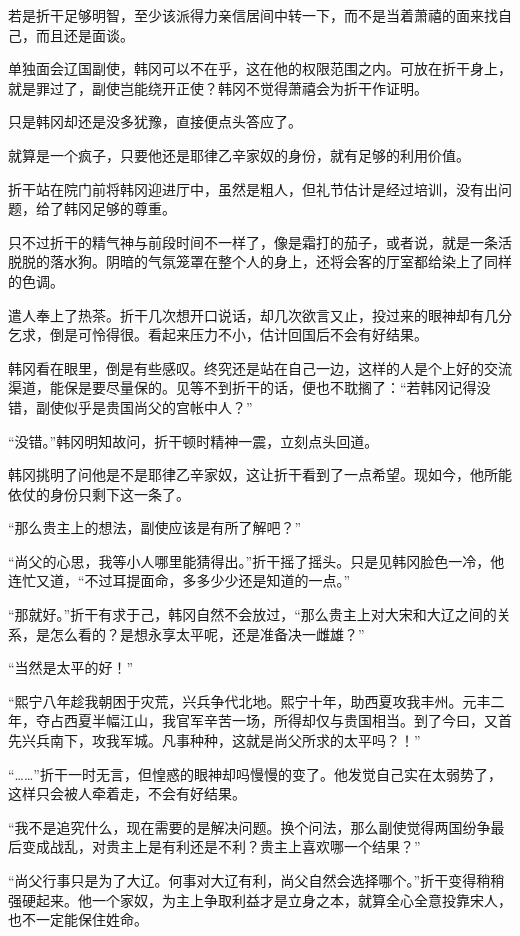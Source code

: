 若是折干足够明智，至少该派得力亲信居间中转一下，而不是当着萧禧的面来找自己，而且还是面谈。

单独面会辽国副使，韩冈可以不在乎，这在他的权限范围之内。可放在折干身上，就是罪过了，副使岂能绕开正使？韩冈不觉得萧禧会为折干作证明。

只是韩冈却还是没多犹豫，直接便点头答应了。

就算是一个疯子，只要他还是耶律乙辛家奴的身份，就有足够的利用价值。

折干站在院门前将韩冈迎进厅中，虽然是粗人，但礼节估计是经过培训，没有出问题，给了韩冈足够的尊重。

只不过折干的精气神与前段时间不一样了，像是霜打的茄子，或者说，就是一条活脱脱的落水狗。阴暗的气氛笼罩在整个人的身上，还将会客的厅室都给染上了同样的色调。

遣人奉上了热茶。折干几次想开口说话，却几次欲言又止，投过来的眼神却有几分乞求，倒是可怜得很。看起来压力不小，估计回国后不会有好结果。

韩冈看在眼里，倒是有些感叹。终究还是站在自己一边，这样的人是个上好的交流渠道，能保是要尽量保的。见等不到折干的话，便也不耽搁了：“若韩冈记得没错，副使似乎是贵国尚父的宫帐中人？”

“没错。”韩冈明知故问，折干顿时精神一震，立刻点头回道。

韩冈挑明了问他是不是耶律乙辛家奴，这让折干看到了一点希望。现如今，他所能依仗的身份只剩下这一条了。

“那么贵主上的想法，副使应该是有所了解吧？”

“尚父的心思，我等小人哪里能猜得出。”折干摇了摇头。只是见韩冈脸色一冷，他连忙又道，“不过耳提面命，多多少少还是知道的一点。”

“那就好。”折干有求于己，韩冈自然不会放过，“那么贵主上对大宋和大辽之间的关系，是怎么看的？是想永享太平呢，还是准备决一雌雄？”

“当然是太平的好！”

“熙宁八年趁我朝困于灾荒，兴兵争代北地。熙宁十年，助西夏攻我丰州。元丰二年，夺占西夏半幅江山，我官军辛苦一场，所得却仅与贵国相当。到了今曰，又首先兴兵南下，攻我军城。凡事种种，这就是尚父所求的太平吗？！”

“……”折干一时无言，但惶惑的眼神却吗慢慢的变了。他发觉自己实在太弱势了，这样只会被人牵着走，不会有好结果。

“我不是追究什么，现在需要的是解决问题。换个问法，那么副使觉得两国纷争最后变成战乱，对贵主上是有利还是不利？贵主上喜欢哪一个结果？”

“尚父行事只是为了大辽。何事对大辽有利，尚父自然会选择哪个。”折干变得稍稍强硬起来。他一个家奴，为主上争取利益才是立身之本，就算全心全意投靠宋人，也不一定能保住姓命。

